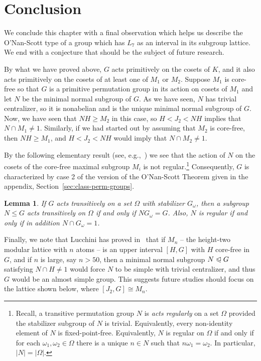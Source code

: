 \documentclass[cm,dissertation,actual,final]{uhthesis}
\theoremstyle{plain}
\newtheorem{lemma}[theorem]{Lemma}
\theoremstyle{definition}
\newcounter{conjecture}
\theoremstyle{remark}
\numberwithin{theorem}{section}
\numberwithin{claim}{chapter}
\numberwithin{equation}{section}
\numberwithin{conjecture}{chapter}
\newcommand{\<}{\ensuremath{\langle}}
\renewcommand{\>}{\ensuremath{\rangle}}
\renewcommand{\leq}{\ensuremath{\leqslant}}
\renewcommand{\geq}{\ensuremath{\geqslant}}
\newcommand{\subnormal}{\ensuremath{\trianglelefteqslant}}
\newcommand{\0}{\ensuremath{\mathbf{0}}}
\newcommand{\1}{\ensuremath{\mathbf{1}}}
\newcommand{\2}{\ensuremath{\mathbf{2}}}
\newcommand{\3}{\ensuremath{\mathbf{3}}}
\newcommand{\4}{\ensuremath{\mathbf{4}}}
\newcommand{\5}{\ensuremath{\mathbf{5}}}
\begin{document}
\section{Conclusion}
We conclude this chapter with a final observation which helps us describe the
O'Nan-Scott type of a group which has $L_7$ as an interval in its subgroup
lattice.  We end with a conjecture that should be the subject of future research.

By what we have proved above, $G$ acts
primitively on the cosets of $K$, and it also acts primitively on the cosets of
at least one of $M_1$ or $M_2$.  Suppose $M_1$ is core-free so that 
$G$ is a primitive permutation group in its action on cosets of $M_1$ and let 
$N$ be the minimal normal subgroup of $G$.  As we have seen, $N$ has trivial
centralizer, so it is nonabelian and is the unique minimal normal subgroup of
$G$.
Now, we have seen that $NH \geq M_2$ in this case, so $H < J_2 < NH$ implies
that $N\cap M_1 \neq 1$.
Similarly, if we had started out by assuming that $M_2$ is core-free, then $NH
\geq M_1$, and $H < J_2 < NH$ would imply
that $N\cap M_2 \neq 1$.  

By the following elementary result (see,
e.g.,~\cite{Isaacs:2008}) we see that the action of $N$ on the cosets of the
core-free maximal subgroup $M_i$ is not regular.\footnote{Recall, 
a transitive permutation group $N$ is
\emph{acts regularly} on a set $\Omega$ provided the stabilizer subgroup of $N$
is trivial.  Equivalently, every non-identity element of $N$ is
fixed-point-free. Equivalently,
$N$ is regular on $\Omega$ if and only if for each $\omega_1, \omega_2 \in
\Omega$ there is a unique $n\in N$ such that $n\omega_1 = \omega_2$.  
In particular, $|N| = |\Omega|$.}
Consequently, $G$ is characterized by case 2 of the version of the O'Nan-Scott
Theorem given in the appendix, Section~\ref{sec:class-perm-groups}. 
\begin{lemma}
If $G$ acts transitively on a set $\Omega$ with stabilizer $G_\omega$, then 
a subgroup $N\leq G$ acts transitively on $\Omega$ if and only if 
$NG_\omega = G$. Also, $N$ is regular if and only if in addition $N \cap
G_\omega = 1$. 
\end{lemma}

Finally, we note that Lucchini has proved in~\cite{Lucchini:1994a} that if $M_n$
-- the height-two modular lattice with $n$ atoms --
is an upper interval $[H,G]$ with $H$ core-free in $G$, and if $n$ is large, say
$n>50$, then a minimal normal subgroup $N\subnormal G$ satisfying $N\cap H  \neq
1$ would force $N$ to be simple with trivial centralizer, and thus $G$ would be
an almost simple group.  This suggests future studies should focus on the
lattice shown below, where $[J_2, G] \cong M_n$.
\end{document}
